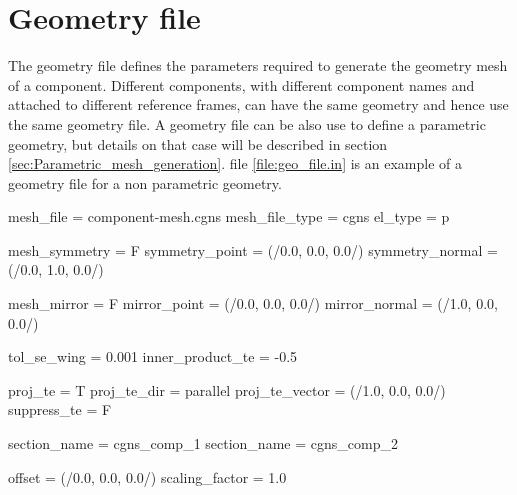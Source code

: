 \section{Geometry file}
The geometry file defines the parameters required to generate the geometry mesh of a component. 
Different components, with different component names and attached to different reference frames, 
can have the same geometry and hence use the same geometry file. A geometry file can be also use 
to define a parametric geometry, but details on that case will be described in section 
\ref{sec:Parametric_mesh_generation}. file \ref{file:geo_file.in} is an example of a 
geometry file for a non parametric geometry.

\begin{inputfile}[frame=single, caption={geo\_file.in}, label={file:geo_file.in}]
mesh_file = component-mesh.cgns
mesh_file_type = cgns
el_type = p

mesh_symmetry = F
symmetry_point  = (/0.0, 0.0, 0.0/)
symmetry_normal = (/0.0, 1.0, 0.0/)

mesh_mirror = F
mirror_point  = (/0.0, 0.0, 0.0/)
mirror_normal = (/1.0, 0.0, 0.0/)

tol_se_wing  = 0.001
inner_product_te = -0.5

proj_te = T
proj_te_dir = parallel
proj_te_vector = (/1.0, 0.0, 0.0/)
suppress_te = F

section_name = cgns_comp_1
section_name = cgns_comp_2

offset = (/0.0, 0.0, 0.0/)
scaling_factor = 1.0
\end{inputfile}

